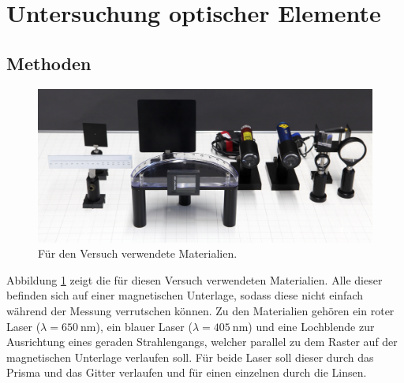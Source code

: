 \section{Untersuchung optischer Elemente}
	
	\subsection{Methoden}
		
			\begin{figure}[ht]
				\centering
				\includegraphics[width=\textwidth]{bilder/aufbau2.jpg}
			 	\caption{Für den Versuch verwendete Materialien.\cite{WWU}}
			 	\label{fig:Aufbau2}	
			\end{figure}
			Abbildung \ref{fig:Aufbau2} zeigt die für diesen Versuch verwendeten Materialien.
			Alle dieser befinden sich auf einer magnetischen Unterlage, sodass diese nicht einfach während der Messung verrutschen können.
			Zu den Materialien gehören ein roter Laser ($\lambda = \SI{650}{\nano\meter}$), ein blauer Laser ($\lambda = \SI{405}{\nano\meter}$) und eine Lochblende zur Ausrichtung eines geraden Strahlengangs, welcher parallel zu dem Raster auf der magnetischen Unterlage verlaufen soll.
			Für beide Laser soll dieser durch das Prisma und das Gitter verlaufen und für einen einzelnen durch die Linsen.
			

